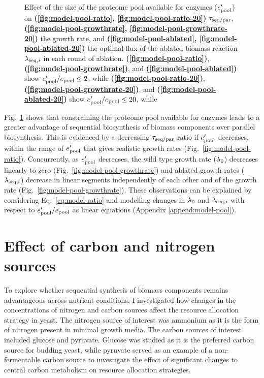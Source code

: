 \begin{figure}
  \caption[
    Effect of the size of the proteome pool available for enzymes
  ]{
    Effect of the size of the proteome pool available for enzymes ($e_{\mathrm{pool}}^{\prime}$) on \textbf{(\ref{fig:model-pool-ratio}, \ref{fig:model-pool-ratio-20})} $\tau_{\mathrm{seq}/\mathrm{par}}$, \textbf{(\ref{fig:model-pool-growthrate}, \ref{fig:model-pool-growthrate-20})} the growth rate, and \textbf{(\ref{fig:model-pool-ablated}, \ref{fig:model-pool-ablated-20})} the optimal flux of the ablated biomass reaction $\lambda_{\mathrm{seq},i}$ in each round of ablation.
    \textbf{(\ref{fig:model-pool-ratio})}, \textbf{(\ref{fig:model-pool-growthrate})}, and \textbf{(\ref{fig:model-pool-ablated})} show $e_{\mathrm{pool}}^{\prime}/e_{\mathrm{pool}} \leq 2$, while
    \textbf{(\ref{fig:model-pool-ratio-20})}, \textbf{(\ref{fig:model-pool-growthrate-20})}, and \textbf{(\ref{fig:model-pool-ablated-20})} show $e_{\mathrm{pool}}^{\prime}/e_{\mathrm{pool}} \leq 20$, while
  }
  \label{fig:model-pool}
\end{figure}

Fig.\ \ref{fig:model-pool} shows that constraining the proteome pool available for enzymes leads to a greater advantage of sequential biosynthesis of biomass components over parallel biosynthesis.
This is evidenced by a decreasing $\tau_{\mathrm{seq}/\mathrm{par}}$ ratio if $e_{\mathrm{pool}}^{\prime}$ decreases, within the range of $e_{\mathrm{pool}}^{\prime}$ that gives realistic growth rates (Fig.\ \ref{fig:model-pool-ratio}).
Concurrently, as $e_{\mathrm{pool}}^{\prime}$ decreases, the wild type growth rate ($\lambda_{0}$) decreases linearly to zero (Fig.\ \ref{fig:model-pool-growthrate}) and ablated growth rates ($\lambda_{\mathrm{seq},i}$) decrease in linear segments independently of each other and of the growth rate (Fig.\ \ref{fig:model-pool-growthrate}).
These observations can be explained by considering Eq.\ \ref{eq:model-ratio} and modelling changes in $\lambda_{0}$ and $\lambda_{\mathrm{seq},i}$ with respect to $e_{\mathrm{pool}}^{\prime}/e_{\mathrm{pool}}$ as linear equations (Appendix \ref{append:model-pool}).


\section{Effect of carbon and nitrogen sources}
\label{sec:model-exchange}

To explore whether sequential synthesis of biomass components remains advantageous across nutrient conditions, I investigated how changes in the concentrations of nitrogen and carbon sources affect the resource allocation strategy in yeast.
The nitrogen source of interest was ammonium as it is the form of nitrogen present in minimal growth media.
The carbon sources of interest included glucose and pyruvate.
Glucose was studied as it is the preferred carbon source for budding yeast, while pyruvate served as an example of a non-fermentable carbon source to investigate the effect of significant changes to central carbon metabolism on resource allocation strategies.

